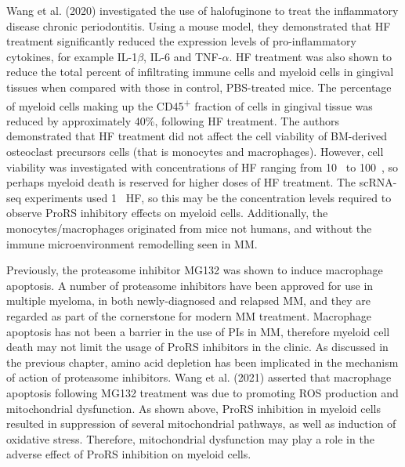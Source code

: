 Wang et al. (2020) investigated the use of halofuginone to treat the inflammatory disease chronic periodontitis\cite{wang2020halofuginone}.
Using a mouse model, they demonstrated that HF treatment significantly reduced the expression levels of pro-inflammatory cytokines, for example IL-1$\beta$, IL-6 and TNF-$\alpha$.
HF treatment was also shown to reduce the total percent of infiltrating immune cells and myeloid cells in gingival tissues when compared with those in control, PBS-treated mice.
The percentage of myeloid cells making up the CD45\textsuperscript{+} fraction of cells in gingival tissue was reduced by approximately 40\%, following HF treatment.
The authors demonstrated that HF treatment did not affect the cell viability of BM-derived osteoclast precursors cells (that is monocytes and macrophages).
However, cell viability was investigated with concentrations of HF ranging from 10\si{\pico\Molar} to 100\si{\nano\Molar}, so perhaps myeloid death is reserved for higher doses of HF treatment.
The scRNA-seq experiments used 1\si{\micro\Molar} HF, so this may be the concentration levels required to observe ProRS inhibitory effects on myeloid cells.
Additionally, the monocytes/macrophages originated from mice not humans, and without the immune microenvironment remodelling seen in MM\@.

Previously, the proteasome inhibitor MG132 was shown to induce macrophage apoptosis\cite{wang2021proteasome}.
A number of proteasome inhibitors have been approved for use in multiple myeloma, in both newly-diagnosed and relapsed MM, and they are regarded as part of the cornerstone for modern MM treatment.
Macrophage apoptosis has not been a barrier in the use of PIs in MM, therefore myeloid cell death may not limit the usage of ProRS inhibitors in the clinic.
As discussed in the previous chapter, amino acid depletion has been implicated in the mechanism of action of proteasome inhibitors.
Wang et al. (2021) asserted that macrophage apoptosis following MG132 treatment was due to promoting ROS production and mitochondrial dysfunction\cite{wang2021proteasome}.
As shown above, ProRS inhibition in myeloid cells resulted in suppression of several mitochondrial pathways, as well as induction of oxidative stress.
Therefore, mitochondrial dysfunction may play a role in the adverse effect of ProRS inhibition on myeloid cells.

